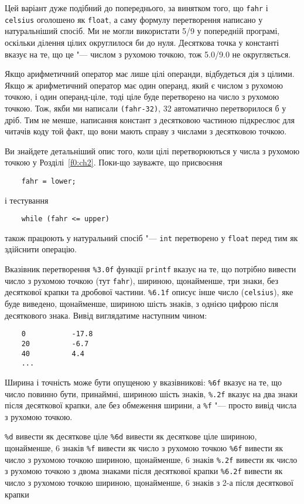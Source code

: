 \documentclass[a4paper,12pt]{book}
\begin{document}
  Цей варіант дуже подібний до попереднього, за винятком того, що \texttt{fahr} і
  \texttt{celsius} оголошено як \texttt{float}, а саму формулу перетворення написано у
  натуральніший спосіб. Ми не могли використати 5/9 у попередній програмі, оскільки
  ділення цілих округлилося би до нуля. Десяткова точка у константі вказує на те, що це
  "--- числом з рухомою точкою, тож 5.0/9.0 не округляється.

  Якщо арифметичний оператор має лише цілі операнди, відбудеться дія з цілими. Якщо ж
  арифметичний оператор має один операнд, який є числом з рухомою точкою, і один
  операнд-ціле, тоді ціле буде перетворено на число з рухомою точкою. Тож, якби ми
  написали \texttt{(fahr-32)}, 32 автоматично перетворилося б у дріб. Тим не менше,
  написання констант з десятковою частиною підкреслює для читачів коду той факт, що вони
  мають справу з числами з десятковою точкою.

  Ви знайдете детальніший опис того, коли цілі перетворюються у числа з рухомою точкою у
  Розділі~\ref{f0:ch2}. Поки-що зауважте, що присвоєння
  \begin{verbatim}
    fahr = lower;
  \end{verbatim}
  і тестування
  \begin{verbatim}
    while (fahr <= upper)
  \end{verbatim}
  також працюють у натуральний спосіб "--- \texttt{int} перетворено у \texttt{float}
  перед тим як здійснити операцію.

  Вказівник перетворення \texttt{\%3.0f} функції \texttt{printf} вказує на те, що потрібно
  вивести число з рухомою точкою (тут \texttt{fahr}), шириною, щонайменше, три знаки, без
  десяткової крапки та дробової частини. \texttt{\%6.1f} описує інше число
  (\texttt{celsius}), яке буде виведено, щонайменше, шириною шість знаків, з однією цифрою
  після десяткового знака. Вивід виглядатиме наступним чином:
  \begin{verbatim}
    0           -17.8
    20          -6.7
    40          4.4
    ...
  \end{verbatim}

  Ширина і точність може бути опущеною у вказівникові: \texttt{\%6f} вказує на те, що число
  повинно бути, принаймні, шириною шість знаків, \texttt{\%.2f} вказує на два знаки після
  десяткової крапки, але без обмеження ширини, а \texttt{\%f} "--- просто вивід числа з
  рухомою точкою.

    {\centering                             \texttt{\%d}
                вивести як десяткове ціле
                              \texttt{\%6d}
                вивести як десяткове ціле шириною, щонайменше, 6 знаків
                              \texttt{\%f}
                вивести як число з рухомою точкою
                              \texttt{\%6f}
                вивести як число з рухомою точкою шириною, щонайменше, 6 знаків
                              \texttt{\%.2f}
                вивести як число з рухомою точкою з двома знаками після десяткової
        крапки
                              \texttt{\%6.2f}
                вивести як число з рухомою точкою шириною, щонайменше, 6 знаків з 2-а після
        десяткової крапки
            }
\end{document}
